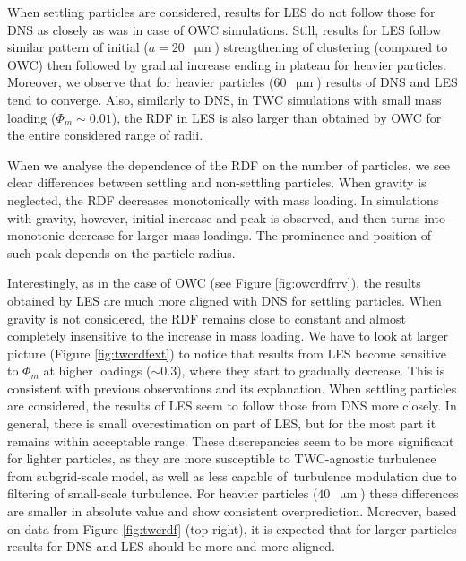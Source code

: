 \documentclass{pracamgren}
\begin{document}
When settling particles are considered, results for LES do not follow those for DNS as closely as was in case of OWC simulations.
Still, results for LES follow similar pattern of initial ($a = 20$~$\upmu\text{m}$) strengthening of clustering (compared to OWC) then followed by gradual increase ending in plateau for heavier particles.
Moreover, we observe that for heavier particles ($60$~$\upmu\text{m}$) results of DNS and LES tend to converge.
Also, similarly to DNS, in TWC simulations with small mass loading ($\Phi_m \sim 0.01$), the RDF  in LES is also larger than obtained by OWC for the entire considered range of radii.

When we analyse the dependence of the RDF on the number of particles, we see clear differences between settling and non-settling particles.
When gravity is neglected, the RDF decreases monotonically with mass loading.
In simulations with gravity, however, initial increase and peak is observed, and then turns into monotonic decrease for larger mass loadings.
The prominence and position of such peak depends on the particle radius.

Interestingly, as in the case of OWC (see Figure \ref{fig:owcrdfrrv}), the results obtained by LES are much more aligned with DNS for settling particles.
When gravity is not considered, the RDF remains close to constant and almost completely insensitive to the increase in mass loading.
We have to look at larger picture (Figure \ref{fig:twcrdfext}) to notice that results from LES become sensitive to $\Phi_m$ at higher loadings ($\sim 0.3$), where they start to gradually decrease.
This is consistent with previous observations and its explanation.
When settling particles are considered, the results of LES seem to follow those from DNS more closely.
In general, there is small overestimation on part of LES, but for the most part it remains within acceptable range.
These discrepancies seem to be more significant for lighter particles, as they are more susceptible to TWC-agnostic turbulence from subgrid-scale model, as well as less capable of~turbulence modulation due to filtering of small-scale turbulence.
For heavier particles ($40$~$\upmu\text{m}$) these differences are smaller in absolute value and show consistent overprediction.
Moreover, based on data from Figure \ref{fig:twcrdf} (top right), it is expected that for larger particles results for DNS and LES should be more and more aligned.
\end{document}
